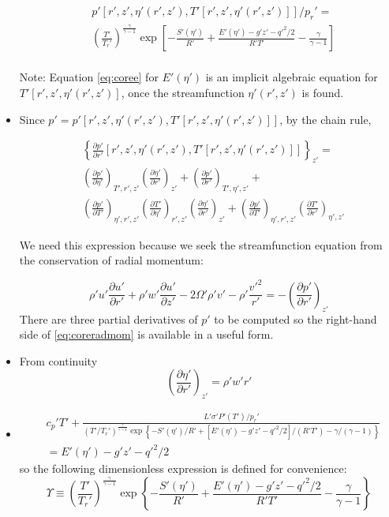 \documentclass[preprint, prX]{revtex4}
\newcommand{\pfrac}[2]{\left(\frac{#1}{#2}\right)}
\newcommand{\pd}[2]{\frac{\partial#1}{\partial#2}}
\newcommand{\tpd}[3]{\left( \frac{\partial#1}{\partial#2} \right)_{#3}}
\newcommand{\gogmo}{\frac{\gamma}{\gamma-1}}
\newcommand{\vgogmo}{\gamma/(\gamma-1)}
\begin{document}
\begin{itemize}
\begin{equation}
\begin{split}
&p'\left[r',z',\eta'(r',z'), T'[r',z',\eta'(r',z')] \right]/p_r' =  \\
&\left( \frac{T'}{T_r'}\right)^\gogmo \exp \left[ -\frac{S'(\eta')}{R'}+ \frac{E'(\eta') - g'z' - q'^2/2}{R' T'} - \gogmo	\right] \\
\end{split}
\label{eq:corep}
\end{equation}

Note: Equation \eqref{eq:coree} for $E'(\eta')$ is an implicit algebraic equation for $T'[r',z',\eta'(r',z')]$, once the streamfunction $\eta'(r',z')$ is found.

\item Since $p' = p'[r',z',\eta'(r',z'), T'[r',z',\eta'(r',z')]]$, by the chain rule,

\begin{equation}
\begin{split}
&\left \{ \pd{ p'}{ r'} \left[r',z',\eta'(r',z'), T'[r',z',\eta'(r',z')] \right] \right \}_{z'} =\\
& \tpd{ p'}{ \eta'}{T', r', z'}\tpd{ \eta'}{ r'}{z'}+\tpd{ p'}{ r'}{T', \eta', z'}+\\
& \tpd{ p'}{ T'}{\eta', r',z'}\tpd{ T'}{ \eta'}{r',z'}\tpd{ \eta'}{ r'}{z'}+\tpd{ p'}{ T'}{\eta', r',z'} \tpd{ T'}{ r'}{\eta',z'}
\end{split}
\label{eq:pchain}
\end{equation}

We need this expression because we seek the streamfunction equation from the conservation of radial momentum:

\begin{equation}
	\rho'u'\pd{ u'}{ r'} + \rho'w' \pd{ u'}{ z'} - 2 \Omega' \rho'v' - \rho' \frac{v'^2}{r'} = -\tpd{ p'}{ r'}{z'}
	\label{eq:coreradmom}
\end{equation}
There are three partial derivatives of $p'$ to be computed so the right-hand side of \eqref{eq:coreradmom} is available in a useful form.

\item From continuity
\begin{equation}
\tpd{ \eta'}{ r'}{z'} = \rho' w' r'
\end{equation}
\item
\begin{equation}
\begin{split}
	&c_p' T' + \frac{L' \sigma' P'(T')/p_r'}{ (T'/T_r')^\gogmo \exp \left\{ -S'(\eta')/R' + [E'(\eta') - g'z' - q'^2/2]/(R'T') - \vgogmo \right\}} \\
	& = E'(\eta') - g'z' - q'^2/2
	\end{split}
	\label{eq:coree2}
\end{equation}
so the following dimensionless expression is defined for convenience:
\begin{equation}
\Upsilon \equiv \pfrac{T'}{T_r'}^\gogmo \exp \left\{ -\frac{S'(\eta')}{R'} + \frac{E'(\eta') - g'z' - q'^2/2}{R'T'} - \gogmo \right\}
\end{equation}


\end{itemize}
\end{document}
